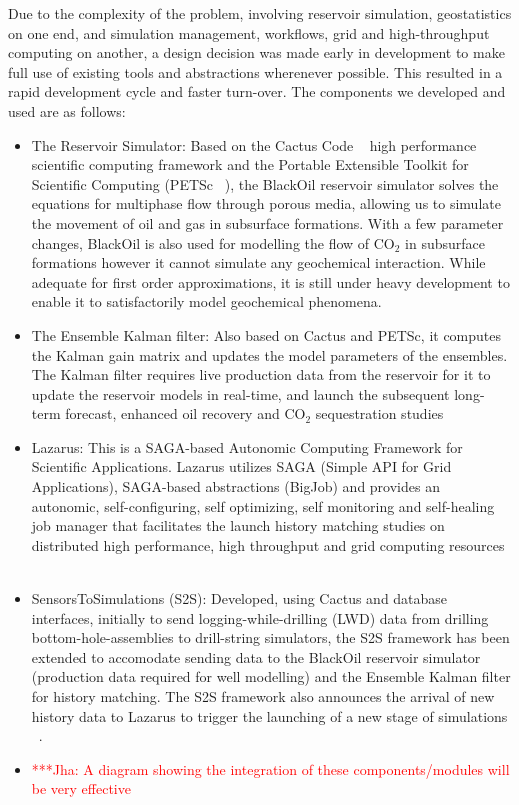 \documentclass[conference,final]{IEEEtran}
\newcommand{\jhanote}[1]{ {\textcolor{red} { ***Jha: #1 }}}
\newcommand{\jhanote}[1]{}
\begin{document}
Due to the complexity of the problem, involving reservoir simulation, geostatistics on one end, and simulation management, workflows, grid and high-throughput computing on another, a design decision was made early in development to make full use of existing tools and abstractions wherenever possible. This resulted in a rapid development cycle and faster turn-over. The components we developed and used are as follows:

\begin{itemize}
\item The Reservoir Simulator: Based on the Cactus Code ~\cite{cactus_web} high performance scientific computing framework and the Portable Extensible Toolkit for Scientific Computing (PETSc ~\cite{PETSc}), the BlackOil reservoir simulator solves the equations for multiphase flow through porous media, allowing us to simulate the movement of oil and gas in subsurface formations. With a few parameter changes, BlackOil is also used for modelling the flow of CO$_2$ in subsurface formations however it cannot simulate any geochemical interaction. While adequate for first order approximations, it is still under heavy development to enable it to satisfactorily model geochemical phenomena.

\item The Ensemble Kalman filter: Also based on Cactus and PETSc, it computes the Kalman gain matrix and updates the model parameters of the ensembles. The Kalman filter requires live production data from the reservoir for it to update the reservoir models in real-time, and launch the subsequent long-term forecast, enhanced oil recovery and CO$_2$ sequestration studies

\item Lazarus: This is a SAGA-based Autonomic Computing Framework for Scientific Applications. Lazarus utilizes SAGA (Simple API for Grid Applications), SAGA-based abstractions (BigJob) and provides an autonomic, self-configuring, self optimizing, self monitoring and self-healing job manager that facilitates the launch history matching studies on distributed high performance, high throughput and grid computing resources ~\cite{gmac}

\item SensorsToSimulations (S2S): Developed, using Cactus and database interfaces, initially to send logging-while-drilling (LWD) data from drilling bottom-hole-assemblies to drill-string simulators, the S2S framework has been extended to accomodate sending data to the BlackOil reservoir simulator (production data required for well modelling) and the Ensemble Kalman filter for history matching. The S2S framework also announces the arrival of new history data to Lazarus to trigger the launching of a new stage of simulations ~\cite{Duff1,Duff2}.

\item \jhanote{A diagram showing the integration of these components/modules will be very effective}

\end{itemize}
\end{document}
